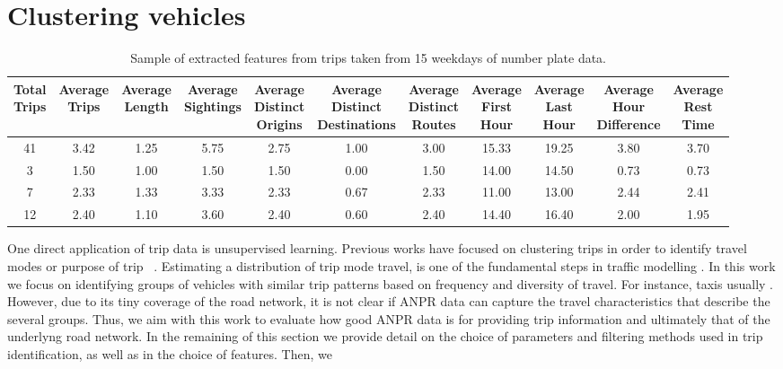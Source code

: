 \section{Clustering vehicles}\label{s.classification}

\begin{table*}[t]
\centering
\small
\begin{tabular}{c c c c c c c c c c c}
  \hline
 \thead{Total\\Trips} & \thead{Average\\Trips} & \thead{Average\\Length} & \thead{Average\\Sightings} & \thead{Average\\Distinct\\Origins} & \thead{Average\\Distinct\\Destinations} & \thead{Average\\Distinct\\Routes} & \thead{Average\\First\\Hour} & \thead{Average\\Last\\Hour} & \thead{Average\\Hour\\Difference} & \thead{Average\\Rest\\Time} \\
  \hline
41 & 3.42 & 1.25 & 5.75 & 2.75 & 1.00 & 3.00 & 15.33 & 19.25 & 3.80 & 3.70 \\
3 & 1.50 & 1.00 & 1.50 & 1.50 & 0.00 & 1.50 & 14.00 & 14.50 & 0.73 & 0.73 \\
7 & 2.33 & 1.33 & 3.33 & 2.33 & 0.67 & 2.33 & 11.00 & 13.00 & 2.44 & 2.41 \\
12 & 2.40 & 1.10 & 3.60 & 2.40 & 0.60 & 2.40 & 14.40 & 16.40 & 2.00 & 1.95 \\
   \hline
\end{tabular}
\caption{Sample of extracted features from trips taken from 15 weekdays of number plate data.}
\label{t:features}
\end{table*}

One direct application of trip data is unsupervised learning. Previous works have focused on clustering trips in order to identify travel modes or purpose of trip ~\cite{Clustering}. Estimating a distribution of trip mode travel, is one of the fundamental steps in traffic modelling . In this work we focus on identifying groups of vehicles with similar trip patterns based on frequency and diversity of travel. For instance, taxis usually .
However, due to its tiny coverage of the road network, it is not clear if ANPR data can capture the travel characteristics that describe the several groups. Thus, we aim with this work to evaluate how good ANPR data is for providing trip information and ultimately that of the underlyng road network. In the remaining of this section we provide detail on the choice of parameters and filtering methods used in trip identification, as well as in the choice of features. Then, we


